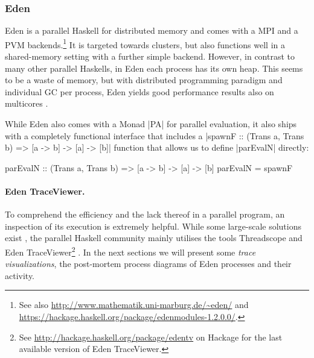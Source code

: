 \subsubsection{Eden}
Eden \cite{eden,Loogen2012} is a parallel Haskell for distributed memory and comes with a MPI and a PVM backends.\footnote{See also \url{http://www.mathematik.uni-marburg.de/~eden/} and \url{https://hackage.haskell.org/package/edenmodules-1.2.0.0/}.} It is targeted towards clusters, but also functions well in a shared-memory setting with a further simple backend. However, in contrast to many other parallel Haskells, in Eden each process has its own heap. This seems to be a waste of memory, but with distributed programming paradigm and individual GC per process, Eden yields good performance results also on multicores \cite{arcs-dc,aswad2009low}.

While Eden also comes with a Monad |PA| for parallel evaluation, it also ships with a completely functional interface that includes
a |spawnF :: (Trans a, Trans b) => [a -> b] -> [a] -> [b]|
function that
allows us to define |parEvalN| directly:

\begin{code}
parEvalN :: (Trans a, Trans b) => [a -> b] -> [a] -> [b]
parEvalN = spawnF 
\end{code}

\paragraph{Eden TraceViewer.}
\label{sec:edentv}
To comprehend the efficiency and the lack thereof in a parallel program, an inspection of its execution is extremely helpful. While some large-scale solutions exist \cite{Geimer2010}, the parallel Haskell community mainly utilises the tools Threadscope \cite{Wheeler2009} and Eden TraceViewer\footnote{See \url{http://hackage.haskell.org/package/edentv} on Hackage for the last available version of Eden TraceViewer.} \cite{Berthold2007a}. In the next sections we will present some \emph{trace visualizations}, the post-mortem process diagrams of Eden processes and their activity.

